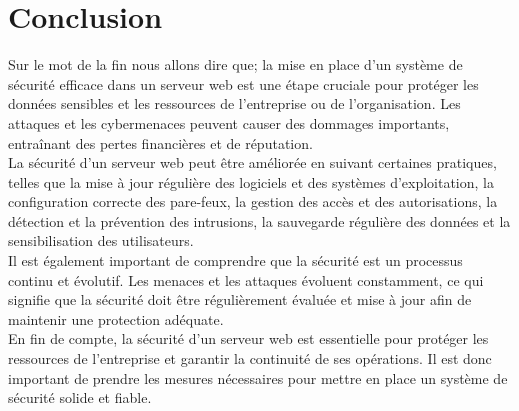 
\chapter{Conclusion}

Sur le mot de la fin nous allons dire que; la mise en place d'un système de sécurité efficace dans un serveur web est une étape cruciale pour protéger les données sensibles et les ressources de l'entreprise ou de l'organisation. Les attaques et les cybermenaces peuvent causer des dommages importants, entraînant des pertes financières et de réputation.\\
La sécurité d'un serveur web peut être améliorée en suivant certaines pratiques, telles que la mise à jour régulière des logiciels et des systèmes d'exploitation, la configuration correcte des pare-feux, la gestion des accès et des autorisations, la détection et la prévention des intrusions, la sauvegarde régulière des données et la sensibilisation des utilisateurs.\\
Il est également important de comprendre que la sécurité est un processus continu et évolutif. Les menaces et les attaques évoluent constamment, ce qui signifie que la sécurité doit être régulièrement évaluée et mise à jour afin de maintenir une protection adéquate.\\
En fin de compte, la sécurité d'un serveur web est essentielle pour protéger les ressources de l'entreprise et garantir la continuité de ses opérations. Il est donc important de prendre les mesures nécessaires pour mettre en place un système de sécurité solide et fiable.\\